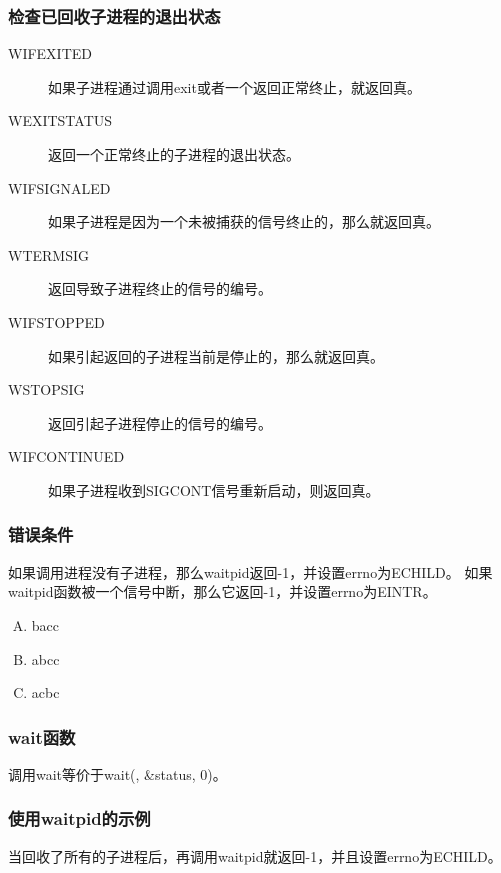 {{        \subsubsection{检查已回收子进程的退出状态}
        {
            \begin{description}
                \item[WIFEXITED] 如果子进程通过调用exit或者一个返回正常终止，就返回真。
                \item[WEXITSTATUS] 返回一个正常终止的子进程的退出状态。
                \item[WIFSIGNALED] 如果子进程是因为一个未被捕获的信号终止的，那么就返回真。
                \item[WTERMSIG] 返回导致子进程终止的信号的编号。
                \item[WIFSTOPPED] 如果引起返回的子进程当前是停止的，那么就返回真。
                \item[WSTOPSIG]  返回引起子进程停止的信号的编号。
                \item[WIFCONTINUED] 如果子进程收到SIGCONT信号重新启动，则返回真。
            \end{description}
        }

        \subsubsection{错误条件}
        {
            如果调用进程没有子进程，那么waitpid返回-1，并设置errno为ECHILD。
            如果waitpid函数被一个信号中断，那么它返回-1，并设置errno为EINTR。

            \begin{practicec}
                \begin{enumerate}[A.]
                    \item bacc
                    \item abcc
                    \item acbc
                \end{enumerate}
            \end{practicec}
        }

        \subsubsection{wait函数}
        {
            调用wait等价于wait(, \&status, 0)。
        }

        \subsubsection{使用waitpid的示例}
        {
            当回收了所有的子进程后，再调用waitpid就返回-1，并且设置errno为ECHILD。

}}}
